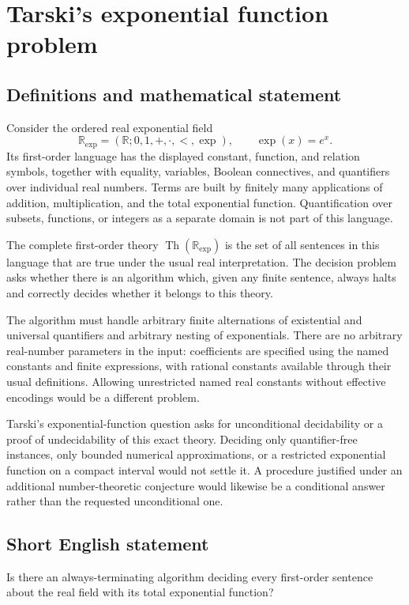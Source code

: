 \documentclass[11pt,a4paper]{article}
\begin{document}
\section*{Tarski's exponential function problem}\label{statement}

\subsection{Definitions and mathematical statement}
Consider the ordered real exponential field
\[
             \mathbb R_{\exp}=(\mathbb R;0,1,+,\cdot,<,\exp),
             \qquad \exp(x)=e^x.
\]
Its first-order language has the displayed constant, function, and relation symbols, together with equality, variables, Boolean connectives, and quantifiers over individual real numbers. Terms are built by finitely many applications of addition, multiplication, and the total exponential function. Quantification over subsets, functions, or integers as a separate domain is not part of this language.

The complete first-order theory $\operatorname{Th}(\mathbb R_{\exp})$ is the set of all sentences in this language that are true under the usual real interpretation. The decision problem asks whether there is an algorithm which, given any finite sentence, always halts and correctly decides whether it belongs to this theory.

The algorithm must handle arbitrary finite alternations of existential and universal quantifiers and arbitrary nesting of exponentials. There are no arbitrary real-number parameters in the input: coefficients are specified using the named constants and finite expressions, with rational constants available through their usual definitions. Allowing unrestricted named real constants without effective encodings would be a different problem.

Tarski's exponential-function question asks for unconditional decidability or a proof of undecidability of this exact theory. Deciding only quantifier-free instances, only bounded numerical approximations, or a restricted exponential function on a compact interval would not settle it. A procedure justified under an additional number-theoretic conjecture would likewise be a conditional answer rather than the requested unconditional one.
\subsection{Short English statement}
Is there an always-terminating algorithm deciding every first-order sentence about the real field with its total exponential function?
\end{document}
